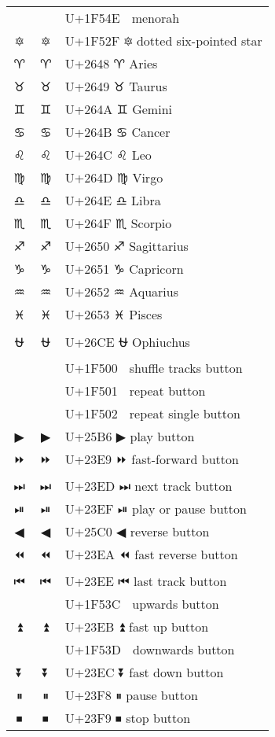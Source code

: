 \documentclass[a4paper,12pt]{ltjarticle}
\newcommand{\fontA}[1]{{\fontspec[RawFeature={mode=harf,+dist,+ccmp}]{Segoe UI Emoji} #1}}
\newcommand{\fontB}[1]{{\fontspec[RawFeature={mode=harf,+dist,+ccmp}]{Noto Color Emoji} #1}}
\begin{document}
\begin{longtable}[c]{ccp{0.8\linewidth}}
\fontA{🕎}&\fontB{🕎}&U+1F54E 🕎 menorah\\
\fontA{🔯}&\fontB{🔯}&U+1F52F 🔯 dotted six-pointed star\\
\fontA{♈}&\fontB{♈}&U+2648 ♈ Aries\\
\fontA{♉}&\fontB{♉}&U+2649 ♉ Taurus\\
\fontA{♊}&\fontB{♊}&U+264A ♊ Gemini\\
\fontA{♋}&\fontB{♋}&U+264B ♋ Cancer\\
\fontA{♌}&\fontB{♌}&U+264C ♌ Leo\\
\fontA{♍}&\fontB{♍}&U+264D ♍ Virgo\\
\fontA{♎}&\fontB{♎}&U+264E ♎ Libra\\
\fontA{♏}&\fontB{♏}&U+264F ♏ Scorpio\\
\fontA{♐}&\fontB{♐}&U+2650 ♐ Sagittarius\\
\fontA{♑}&\fontB{♑}&U+2651 ♑ Capricorn\\
\fontA{♒}&\fontB{♒}&U+2652 ♒ Aquarius\\
\fontA{♓}&\fontB{♓}&U+2653 ♓ Pisces\\
\fontA{⛎}&\fontB{⛎}&U+26CE ⛎ Ophiuchus\\
\fontA{🔀}&\fontB{🔀}&U+1F500 🔀 shuffle tracks button\\
\fontA{🔁}&\fontB{🔁}&U+1F501 🔁 repeat button\\
\fontA{🔂}&\fontB{🔂}&U+1F502 🔂 repeat single button\\
\fontA{▶}&\fontB{▶}&U+25B6 ▶ play button\\
\fontA{⏩}&\fontB{⏩}&U+23E9 ⏩ fast-forward button\\
\fontA{⏭}&\fontB{⏭}&U+23ED ⏭ next track button\\
\fontA{⏯}&\fontB{⏯}&U+23EF ⏯ play or pause button\\
\fontA{◀}&\fontB{◀}&U+25C0 ◀ reverse button\\
\fontA{⏪}&\fontB{⏪}&U+23EA ⏪ fast reverse button\\
\fontA{⏮}&\fontB{⏮}&U+23EE ⏮ last track button\\
\fontA{🔼}&\fontB{🔼}&U+1F53C 🔼 upwards button\\
\fontA{⏫}&\fontB{⏫}&U+23EB ⏫ fast up button\\
\fontA{🔽}&\fontB{🔽}&U+1F53D 🔽 downwards button\\
\fontA{⏬}&\fontB{⏬}&U+23EC ⏬ fast down button\\
\fontA{⏸}&\fontB{⏸}&U+23F8 ⏸ pause button\\
\fontA{⏹}&\fontB{⏹}&U+23F9 ⏹ stop button\\

\end{longtable}
\end{document}
